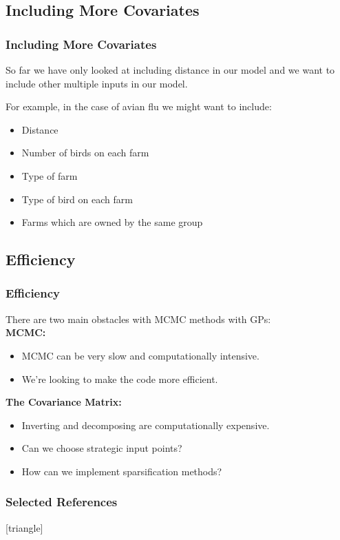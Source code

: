 \documentclass[demo]{beamer}
\begin{document}
\subsection{Including More Covariates}
\begin{frame}
	\frametitle{Including More Covariates}
	So far we have only looked at including distance in our model and 
	we want to include other multiple inputs in our model. \\
	\vspace{1em}
	
	For example, in the case of avian flu we might want to include:
	\begin{itemize}
		\item Distance
		\item Number of birds on each farm
		\item Type of farm
		\item Type of bird on each farm
		\item Farms which are owned by the same group
	\end{itemize}

\end{frame}

\subsection{Efficiency}
\begin{frame}
	\frametitle{Efficiency}
	There are two main obstacles with MCMC methods with GPs:\\
		\textbf{MCMC:}\\
	\begin{itemize}
		\item MCMC can be very slow and computationally intensive.
		\item We're looking to make the code more efficient. 
	\end{itemize}
	\textbf{The Covariance Matrix:}\\
	\begin{itemize}
		\item Inverting and decomposing are computationally expensive.
		\item Can we choose strategic input points?
		\item How can we implement sparsification methods?
	\end{itemize}



\end{frame}

\begin{frame}
\frametitle{Selected References}
[triangle]


\end{frame}
\end{document}

